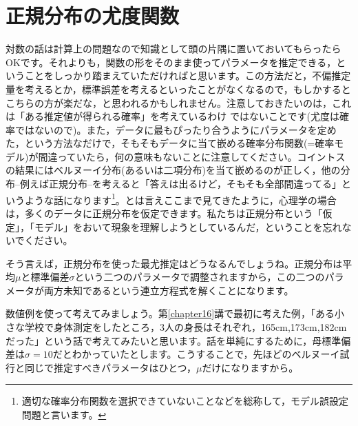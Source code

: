 \documentclass{ltjsarticle}
\begin{document}
\section{正規分布の尤度関数}
対数の話は計算上の問題なので知識として頭の片隅に置いておいてもらったらOKです。それよりも，関数の形をそのまま使ってパラメータを推定できる，ということをしっかり踏まえていただければと思います。この方法だと，不偏推定量を考えるとか，標準誤差を考えるといったことがなくなるので，もしかするとこちらの方が楽だな，と思われるかもしれません。注意しておきたいのは，これは「ある推定値が得られる確率」を考えているわけ
ではないことです(尤度は確率ではないので)。また，データに最もぴったり合うようにパラメータを定めた，という方法なだけで，そもそもデータに当て嵌める確率分布関数(=確率モデル)が間違っていたら，何の意味もないことに注意してください。コイントスの結果にはベルヌーイ分布(あるいは二項分布)を当て嵌めるのが正しく，他の分布--例えば正規分布--を考えると「答えは出るけど，そもそも全部間違ってる」というような話になります\footnote{適切な確率分布関数を選択できていないことなどを総称して，モデル誤設定問題と言います。}。とは言えここまで見てきたように，心理学の場合は，多くのデータに正規分布を仮定できます。私たちは正規分布という「仮定」，「モデル」をおいて現象を理解しようとしているんだ，ということを忘れないでください。

そう言えば，正規分布を使った最尤推定はどうなるんでしょうね。正規分布は平均$\mu$と標準偏差$\sigma$という二つのパラメータで調整されますから，この二つのパラメータが両方未知であるという連立方程式を解くことになります。

数値例を使って考えてみましょう。第\ref{chapter16}講で最初に考えた例，「ある小さな学校で身体測定をしたところ，3人の身長はそれぞれ，165cm,173cm,182cmだった」という話で考えてみたいと思います。話を単純にするために，母標準偏差は$\sigma=10$だとわかっていたとします。こうすることで，先ほどのベルヌーイ試行と同じで推定すべきパラメータはひとつ，$\mu$だけになりますから。
\end{document}
